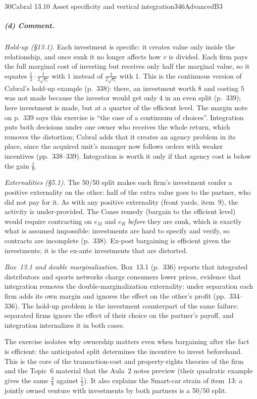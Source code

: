 \begin{exsol}{30}{Cabral 13.10 Asset specificity and vertical integration}{346}{Advanced}{B3}
\subparagraph{(d) Comment.}
\emph{Hold-up (\S13.1).} Each investment is specific: it creates value only inside the
relationship, and once sunk it no longer affects how $v$ is divided. Each firm pays the full
marginal cost of investing but receives only half the marginal value, so it equates
$\tfrac12 \cdot \tfrac{1}{2\sqrt{e_i}}$ with $1$ instead of $\tfrac{1}{2\sqrt{e_i}}$ with $1$.
This is the continuous version of Cabral's hold-up example (p.~338): there, an investment worth
$8$ and costing $5$ was not made because the investor would get only $4$ in an even split
(p.~339); here investment is made, but at a quarter of the efficient level. The margin note on
p.~339 says this exercise is ``the case of a continuum of choices''. Integration puts both
decisions under one owner who receives the whole return, which removes the distortion; Cabral
adds that it creates an agency problem in its place, since the acquired unit's manager now
follows orders with weaker incentives (pp.~338--339). Integration is worth it only if that
agency cost is below the gain $\tfrac18$.

\emph{Externalities (\S5.1).} The 50/50 split makes each firm's investment confer a positive
externality on the other: half of the extra value goes to the partner, who did not pay for it.
As with any positive externality (front yards, item~9), the activity is under-provided. The
Coase remedy (bargain to the efficient level) would require contracting on $e_M$ and $e_R$
\emph{before} they are sunk, which is exactly what is assumed impossible: investments are hard
to specify and verify, so contracts are incomplete (p.~338). Ex-post bargaining is efficient
given the investments; it is the ex-ante investments that are distorted.

\emph{Box~13.1 and double marginalization.} Box~13.1 (p.~336) reports that integrated
distributors and sports networks charge consumers lower prices, evidence that integration
removes the double-marginalization externality: under separation each firm adds its own margin
and ignores the effect on the other's profit (pp.~334--336). The hold-up problem is the
investment counterpart of the same failure: separated firms ignore the effect of their choice on
the partner's payoff, and integration internalizes it in both cases.

\interp The exercise isolates why ownership matters even when bargaining after the fact is
efficient: the anticipated split determines the incentive to invest beforehand. This is the core
of the transaction-cost and property-rights theories of the firm and the Topic~6 material that
the Aula~2 notes preview (their quadratic example gives the same $\tfrac38$ against
$\tfrac12$). It also explains the Smart-car strain of item~13: a jointly owned venture with
investments by both partners is a 50/50 split.


\end{exsol}
